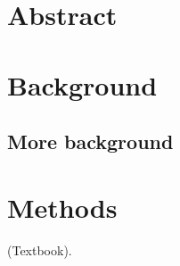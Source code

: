 
\newcommand{\assignmenttype}{Assignment}
\newcommand{\assignmentnumber}{0}
\newcommand{\assignmenttitle}{Path Planning Example}
\newcommand{\assignmentdue}{2021-01-01}
\newcommand{\assignmentabstract}{\lipsum[2]}




\section{Abstract}

\lipsum[1]

\section{Background}

\lipsum[2]

\subsection{More background}

\lipsum[3]

\section{Methods}

\lipsum[4]

\cite{LaValle} (Textbook).  








